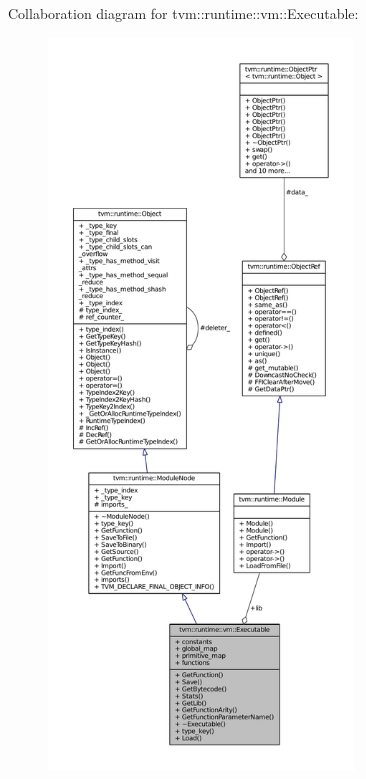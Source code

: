 Collaboration diagram for tvm\+:\+:runtime\+:\+:vm\+:\+:Executable\+:
\nopagebreak
\begin{figure}[H]
\begin{center}
\leavevmode
\includegraphics[height=550pt]{classtvm_1_1runtime_1_1vm_1_1Executable__coll__graph}
\end{center}
\end{figure}
